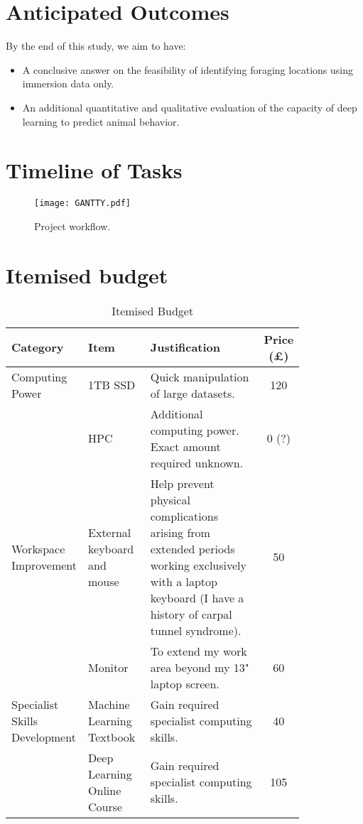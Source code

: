 \documentclass[11pt]{article}
\begin{document}
\begin{onehalfspace}
  \section{Anticipated Outcomes}
    By the end of this study, we aim to have:

    \begin{itemize}
      \item A conclusive answer on the feasibility of identifying foraging locations using immersion data only.
      \item An additional quantitative and qualitative evaluation of the capacity of deep learning to predict animal behavior.
    \end{itemize}
    
  
  \section{Timeline of Tasks}
    \begin{figure}[H]
      \centerline{\texttt{[image: GANTTY.pdf]}}
      \caption{\small Project workflow.}
    \end{figure}
  
  \section{Itemised budget}
  
  \begin{table}[ht]
    \caption{Itemised Budget} %
    \centering %
    \begin{tabular}{ |P{0.15\linewidth}|P{0.22\linewidth}|P{0.45\linewidth}|c| } %
    \hline %
    \textbf{Category} & \textbf{Item} & \textbf{Justification} & \textbf{Price (£)} \\ [0.5ex] %
    \hline %
    Computing Power & 1TB SSD & Quick manipulation of large datasets. & 120 \\
      
    & HPC & Additional computing power. Exact amount required unknown. & 0 (?) \\
    \hline
    Workspace Improvement & External keyboard and mouse & Help prevent physical complications arising from extended periods working exclusively with a laptop keyboard (I have a history of carpal tunnel syndrome). & 50 \\ [1ex] %
      
    & Monitor & To extend my work area beyond my 13" laptop screen. & 60 \\
    \hline
    Specialist Skills Development & Machine Learning Textbook & Gain required specialist computing skills. & 40 \\ 
      
    & Deep Learning Online Course & Gain required specialist computing skills. & 105 \\
    \hline
    

\end{tabular}
\end{table}
\end{onehalfspace}
\end{document}
